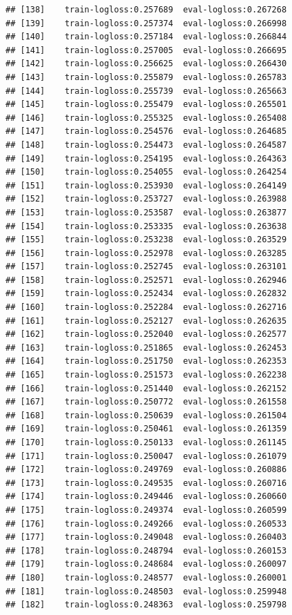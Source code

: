 \documentclass[
]{article}
\begin{document}
\begin{verbatim}
## [138]    train-logloss:0.257689  eval-logloss:0.267268 
## [139]    train-logloss:0.257374  eval-logloss:0.266998 
## [140]    train-logloss:0.257184  eval-logloss:0.266844 
## [141]    train-logloss:0.257005  eval-logloss:0.266695 
## [142]    train-logloss:0.256625  eval-logloss:0.266430 
## [143]    train-logloss:0.255879  eval-logloss:0.265783 
## [144]    train-logloss:0.255739  eval-logloss:0.265663 
## [145]    train-logloss:0.255479  eval-logloss:0.265501 
## [146]    train-logloss:0.255325  eval-logloss:0.265408 
## [147]    train-logloss:0.254576  eval-logloss:0.264685 
## [148]    train-logloss:0.254473  eval-logloss:0.264587 
## [149]    train-logloss:0.254195  eval-logloss:0.264363 
## [150]    train-logloss:0.254055  eval-logloss:0.264254 
## [151]    train-logloss:0.253930  eval-logloss:0.264149 
## [152]    train-logloss:0.253727  eval-logloss:0.263988 
## [153]    train-logloss:0.253587  eval-logloss:0.263877 
## [154]    train-logloss:0.253335  eval-logloss:0.263638 
## [155]    train-logloss:0.253238  eval-logloss:0.263529 
## [156]    train-logloss:0.252978  eval-logloss:0.263285 
## [157]    train-logloss:0.252745  eval-logloss:0.263101 
## [158]    train-logloss:0.252571  eval-logloss:0.262946 
## [159]    train-logloss:0.252434  eval-logloss:0.262832 
## [160]    train-logloss:0.252284  eval-logloss:0.262716 
## [161]    train-logloss:0.252127  eval-logloss:0.262635 
## [162]    train-logloss:0.252040  eval-logloss:0.262577 
## [163]    train-logloss:0.251865  eval-logloss:0.262453 
## [164]    train-logloss:0.251750  eval-logloss:0.262353 
## [165]    train-logloss:0.251573  eval-logloss:0.262238 
## [166]    train-logloss:0.251440  eval-logloss:0.262152 
## [167]    train-logloss:0.250772  eval-logloss:0.261558 
## [168]    train-logloss:0.250639  eval-logloss:0.261504 
## [169]    train-logloss:0.250461  eval-logloss:0.261359 
## [170]    train-logloss:0.250133  eval-logloss:0.261145 
## [171]    train-logloss:0.250047  eval-logloss:0.261079 
## [172]    train-logloss:0.249769  eval-logloss:0.260886 
## [173]    train-logloss:0.249535  eval-logloss:0.260716 
## [174]    train-logloss:0.249446  eval-logloss:0.260660 
## [175]    train-logloss:0.249374  eval-logloss:0.260599 
## [176]    train-logloss:0.249266  eval-logloss:0.260533 
## [177]    train-logloss:0.249048  eval-logloss:0.260403 
## [178]    train-logloss:0.248794  eval-logloss:0.260153 
## [179]    train-logloss:0.248684  eval-logloss:0.260097 
## [180]    train-logloss:0.248577  eval-logloss:0.260001 
## [181]    train-logloss:0.248503  eval-logloss:0.259948 
## [182]    train-logloss:0.248363  eval-logloss:0.259798 

\end{verbatim}
\end{document}
